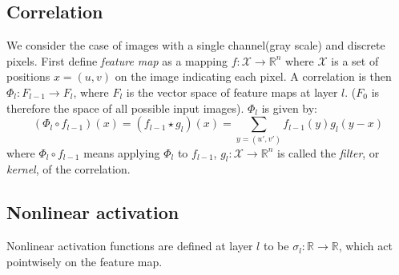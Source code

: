 \documentclass{IEEEtran}
\begin{document}
\subsection*{Correlation}
We consider the case of images with a single channel(gray scale) and discrete pixels. 
First define \emph{feature map} as a mapping $f\colon \mathcal{X}\to \mathbb{R}^n$ where $\mathcal{X}$ is a 
set of positions $x = (u,v)$ on the image indicating each pixel.
A correlation is then $\Phi_l\colon F_{l-1} \to F_{l}$, where $F_l$ is the vector space of feature maps at layer $l$. 
($F_0$ is therefore the space of all possible input images).
$\Phi_l$ is given by:
\begin{equation}
    \label{E:convolution}
    (\Phi_l \circ f_{l-1})(x) = (f_{l-1} \star g_l)(x) = \sum_{y = (u',v')} f_{l-1}(y) g_l(y-x)
\end{equation}
where $\Phi_l \circ f_{l-1}$ means applying $\Phi_l$ to $f_{l-1}$, 
$g_l\colon \mathcal{X}\to \mathbb{R}^n$ is called the \emph{filter}, or \emph{kernel}, of the correlation. 


\subsection*{Nonlinear activation}
Nonlinear activation functions are defined at layer $l$ to be $\sigma_l:\mathbb{R} \to \mathbb{R}$, which act pointwisely on the feature map.
\end{document}
